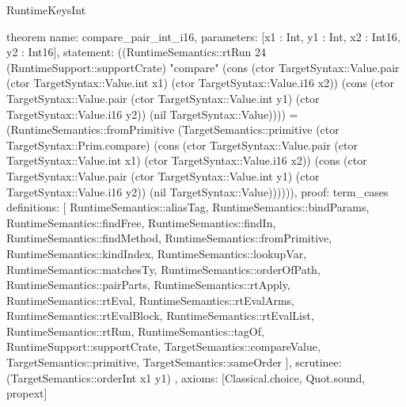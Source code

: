 \begin{lexlean}{RuntimeKeysInt}
\begin{semanticmodule}
theorem{
  name: compare_pair_int_i16,
  parameters: [x1 : Int, y1 : Int, x2 : Int16, y2 : Int16],
  statement: ((RuntimeSemantics::rtRun 24 (RuntimeSupport::supportCrate) "compare" (cons (ctor TargetSyntax::Value.pair (ctor TargetSyntax::Value.int x1) (ctor TargetSyntax::Value.i16 x2)) (cons (ctor TargetSyntax::Value.pair (ctor TargetSyntax::Value.int y1) (ctor TargetSyntax::Value.i16 y2)) (nil TargetSyntax::Value)))) = (RuntimeSemantics::fromPrimitive (TargetSemantics::primitive (ctor TargetSyntax::Prim.compare) (cons (ctor TargetSyntax::Value.pair (ctor TargetSyntax::Value.int x1) (ctor TargetSyntax::Value.i16 x2)) (cons (ctor TargetSyntax::Value.pair (ctor TargetSyntax::Value.int y1) (ctor TargetSyntax::Value.i16 y2)) (nil TargetSyntax::Value)))))),
  proof: term_cases{
    definitions: [
      RuntimeSemantics::aliasTag,
      RuntimeSemantics::bindParams,
      RuntimeSemantics::findFree,
      RuntimeSemantics::findIn,
      RuntimeSemantics::findMethod,
      RuntimeSemantics::fromPrimitive,
      RuntimeSemantics::kindIndex,
      RuntimeSemantics::lookupVar,
      RuntimeSemantics::matchesTy,
      RuntimeSemantics::orderOfPath,
      RuntimeSemantics::pairParts,
      RuntimeSemantics::rtApply,
      RuntimeSemantics::rtEval,
      RuntimeSemantics::rtEvalArms,
      RuntimeSemantics::rtEvalBlock,
      RuntimeSemantics::rtEvalList,
      RuntimeSemantics::rtRun,
      RuntimeSemantics::tagOf,
      RuntimeSupport::supportCrate,
      TargetSemantics::compareValue,
      TargetSemantics::primitive,
      TargetSemantics::sameOrder
    ],
    scrutinee: (TargetSemantics::orderInt x1 y1)
  },
  axioms: [Classical.choice, Quot.sound, propext]
}


\end{semanticmodule}
\end{lexlean}
